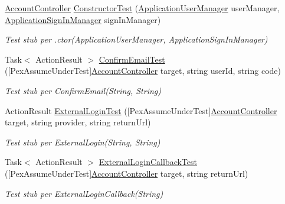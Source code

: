 \begin{DoxyCompactItemize}
\item 
\mbox{\hyperlink{class_brew_day2_1_1_controllers_1_1_account_controller}{Account\+Controller}} \mbox{\hyperlink{class_brew_day2_1_1_controllers_1_1_tests_1_1_account_controller_test_a643ce681cea562f9fec8b9ce8beb3170}{Constructor\+Test}} (\mbox{\hyperlink{class_brew_day2_1_1_application_user_manager}{Application\+User\+Manager}} user\+Manager, \mbox{\hyperlink{class_brew_day2_1_1_application_sign_in_manager}{Application\+Sign\+In\+Manager}} sign\+In\+Manager)
\begin{DoxyCompactList}\small\item\em Test stub per .ctor(\+Application\+User\+Manager, Application\+Sign\+In\+Manager)\end{DoxyCompactList}\item 
Task$<$ Action\+Result $>$ \mbox{\hyperlink{class_brew_day2_1_1_controllers_1_1_tests_1_1_account_controller_test_a749ece77607e679e5c6c93212b1958c8}{Confirm\+Email\+Test}} (\mbox{[}Pex\+Assume\+Under\+Test\mbox{]}\mbox{\hyperlink{class_brew_day2_1_1_controllers_1_1_account_controller}{Account\+Controller}} target, string user\+Id, string code)
\begin{DoxyCompactList}\small\item\em Test stub per Confirm\+Email(\+String, String)\end{DoxyCompactList}\item 
Action\+Result \mbox{\hyperlink{class_brew_day2_1_1_controllers_1_1_tests_1_1_account_controller_test_a182df94b6ee7279d7be76e3ca10bac3e}{External\+Login\+Test}} (\mbox{[}Pex\+Assume\+Under\+Test\mbox{]}\mbox{\hyperlink{class_brew_day2_1_1_controllers_1_1_account_controller}{Account\+Controller}} target, string provider, string return\+Url)
\begin{DoxyCompactList}\small\item\em Test stub per External\+Login(\+String, String)\end{DoxyCompactList}\item 
Task$<$ Action\+Result $>$ \mbox{\hyperlink{class_brew_day2_1_1_controllers_1_1_tests_1_1_account_controller_test_a29aacc4da4774f24da9636d5335f4352}{External\+Login\+Callback\+Test}} (\mbox{[}Pex\+Assume\+Under\+Test\mbox{]}\mbox{\hyperlink{class_brew_day2_1_1_controllers_1_1_account_controller}{Account\+Controller}} target, string return\+Url)
\begin{DoxyCompactList}\small\item\em Test stub per External\+Login\+Callback(\+String)\end{DoxyCompactList}\item 

\end{DoxyCompactItemize}
